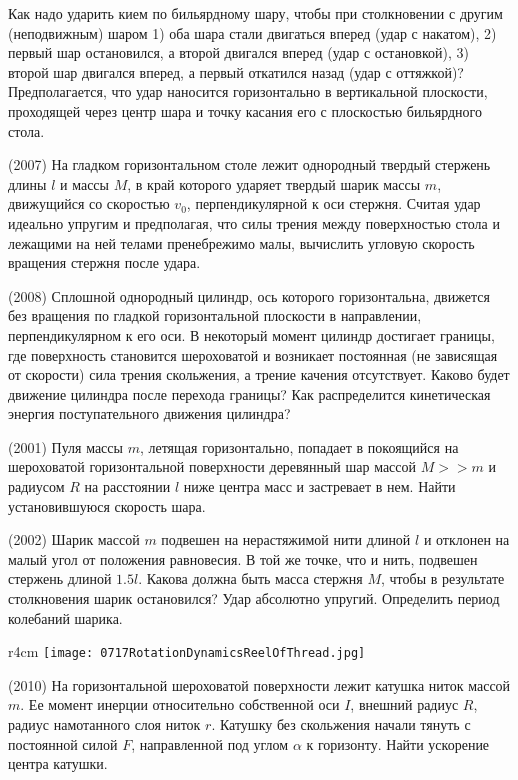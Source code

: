 \AddProb Как надо ударить кием по бильярдному шару, чтобы при столкновении с другим (неподвижным) шаром 
1) оба шара стали двигаться вперед (удар с накатом), 2) первый шар остановился, а второй двигался вперед (удар с остановкой), 
3) второй шар двигался вперед, а первый откатился назад (удар с оттяжкой)? 
Предполагается, что удар наносится горизонтально в вертикальной плоскости, проходящей через центр шара и точку касания его с плоскостью бильярдного стола.


\AddProb (2007) На гладком горизонтальном столе лежит однородный твердый стержень длины $l$ и массы $M$, 
в край которого ударяет твердый шарик массы $m$, движущийся со скоростью $v_0$, перпендикулярной к оси стержня. 
Считая удар идеально упругим и предполагая, что силы трения между поверхностью стола и лежащими на ней телами пренебрежимо малы, 
вычислить угловую скорость вращения стержня после удара.

\AddProb (2008) Сплошной однородный цилиндр, ось которого горизонтальна, движется без вращения по гладкой горизонтальной плоскости в направлении, 
перпендикулярном к его оси. В некоторый момент цилиндр достигает границы, где поверхность становится шероховатой и возникает постоянная 
(не зависящая от скорости) сила трения скольжения, а трение качения отсутствует. Каково будет движение цилиндра после перехода границы? 
Как распределится кинетическая энергия поступательного движения цилиндра?

\AddProb (2001) Пуля массы $m$, летящая горизонтально, попадает в покоящийся на шероховатой горизонтальной поверхности деревянный шар массой 
$M >> m$  и радиусом $R$ на расстоянии $l $ ниже центра масс и застревает в нем. Найти установившуюся скорость шара.

\AddProb (2002) Шарик массой $m$ подвешен на нерастяжимой нити длиной $l$ и отклонен на малый угол от положения равновесия. 
В той же точке, что и нить, подвешен стержень длиной $1.5l$. Какова должна быть масса стержня $M$, чтобы в результате столкновения шарик остановился? 
Удар абсолютно упругий. Определить период колебаний шарика.

\begin{wrapfigure}{r}{4cm}
\texttt{[image: 0717RotationDynamicsReelOfThread.jpg]}
\end{wrapfigure}

\AddProb (2010) На горизонтальной шероховатой поверхности лежит катушка ниток массой $m$. 
Ее момент инерции относительно собственной оси $I$, внешний радиус $R$, радиус намотанного слоя ниток $r$. 
Катушку без скольжения начали тянуть с постоянной силой $F$, направленной под углом $\alpha$ к горизонту. Найти ускорение центра катушки.